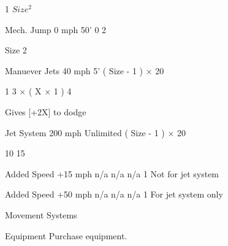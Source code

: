 \documentclass[twoside]{book}
\begin{document}
                       1   
                       $Size^2$   
                      
                      
                       Mech. Jump   
                       0 mph   
                       50'   
                       0   
                       2   
                      
                           Size  2 
                          
                        
                      
                      
                       Manuever Jets   
                       40 mph   
                       5'   
                             (    Size  
                          -    1    )   
                         ×    20   
                        
                       1   
                               3 
                         ×    (    X  
                          ×    1    )
                              4  
                         
                        
                       Gives [+2X] to dodge   
                      
                      
                       Jet System   
                       200 mph   
                       Unlimited   
                             (    Size  
                          -    1    )   
                         ×    20   
                        
                       10   
                       15   
                      
                      
                       Added Speed   
                       +15 mph   
                       n/a   
                       n/a   
                       n/a   
                       1   
                       Not for jet system   
                      
                      
                       Added Speed   
                       +50 mph   
                       n/a   
                       n/a   
                       n/a   
                       1   
                       For jet system only   
                      
                    
                  Movement Systems  
                  
                
                
                Equipment  
                  Purchase equipment.   
                
\end{document}
